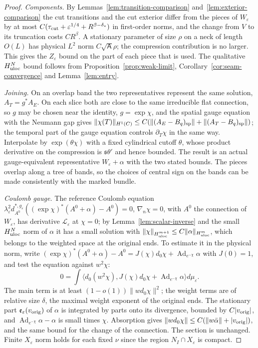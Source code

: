 \documentclass[11pt]{amsart}
\theoremstyle{definition}
\theoremstyle{remark}
\theoremstyle{plain}
\numberwithin{equation}{section}
\newcommand{\eps}{\varepsilon}
\begin{document}
\begin{proof}
\emph{Components.} By Lemmas~\ref{lem:transition-comparison}
and~\ref{lem:exterior-comparison} the cut transitions and the cut exterior
differ from the pieces of $W_\eps$ by at most $C(\tau_{\rm cut}+\eps^{1/4}+R^{\beta-\delta_*})$ in first-order
norms, and the change from $V$ to its truncation costs $CR^\beta$. A stationary
parameter of size $\rho$ on a neck of length $O(L)$ has physical $L^2$ norm
$C\sqrt{\mathsf A}\rho$; the compression contribution is no larger. This gives the
$Z_\eps$ bound on the part of each piece that is used. The qualitative $H^N_{\rm uloc}$ bound
follows from Proposition~\ref{prop:weak-limit}, Corollary~\ref{cor:seam-convergence}
and Lemma~\ref{lem:entry}.

\emph{Joining.} On an overlap band the two representatives represent
the same solution, $A_T=g^*A_E$. On each slice both are close to the same
irreducible flat connection, so $g$ may be chosen near the identity, $g=\exp\chi$,
and the spatial gauge equation with the Neumann gap gives
$\|\chi(T)\|_{H^1(C)}\le C(\|(A_E-B_q)_{\rm sp}\|+\|(A_T-B_q)_{\rm sp}\|)$; the
temporal part of the gauge equation controls $\partial_T\chi$ in the same way.
Interpolate by $\exp(\theta\chi)$ with a fixed cylindrical cutoff $\theta$, whose
product derivative on the compression is ${\mathfrak s}\theta'$ and hence bounded. The
result is an actual gauge-equivalent representative $W_\eps+\alpha$ with the
two stated bounds. The pieces overlap along a tree of bands, so the choices of central sign on the bands can be made consistently with the marked bundle.

\emph{Coulomb gauge.} The reference Coulomb equation
$\lambda_\eps^2d^{*,g_\eps}_{A^0}((\exp\chi)^*(A^0+\alpha)-A^0)=0$, $\nabla_n\chi=0$,
with $A^0$ the connection of $W_\eps$, has derivative $\mathcal L_\eps$ at
$\chi=0$; by Lemma~\ref{lem:scalar-inverse} and the small $H^N_{\rm uloc}$ norm of
$\alpha$ it has a small solution with
$\|\chi\|_{H^{m+1}_{\rm uloc}}\le C\|\alpha\|_{H^m_{\rm uloc}}$, which belongs to the
weighted space at the original ends. To estimate it in the physical norm, write
$(\exp\chi)^*(A^0+\alpha)-A^0=J(\chi)d_0\chi+\operatorname{Ad}_{e^{-\chi}}\alpha$ with
$J(0)=1$, and test the equation against $w^2\chi$:
\[
0=\int\bigl\langle d_0(w^2\chi),J(\chi)d_0\chi+\operatorname{Ad}_{e^{-\chi}}\alpha\bigr\rangle
d\mu_\eps .
\]
The main term is at least $(1-o(1))\|wd_0\chi\|^2$; the weight terms are of
relative size $\delta$, the maximal weight exponent of the original ends. The stationary part
$\mathfrak e_\eps(v_{\rm orig})$ of $\alpha$ is integrated by parts onto its divergence,
bounded by $C|v_{\rm orig}|$, and $\operatorname{Ad}_{e^{-\chi}}\alpha-\alpha$ is small
times $\chi$. Absorption gives
$\|wd_0\chi\|\le C(\|w\bar\alpha\|+|v_{\rm orig}|)$, and the same bound for the
change of the connection. The section is unchanged. Finite $X_\eps$ norm
holds for each fixed $\nu$ since the region $N_I\cap X_\eps$ is compact.
\end{proof}
\end{document}
